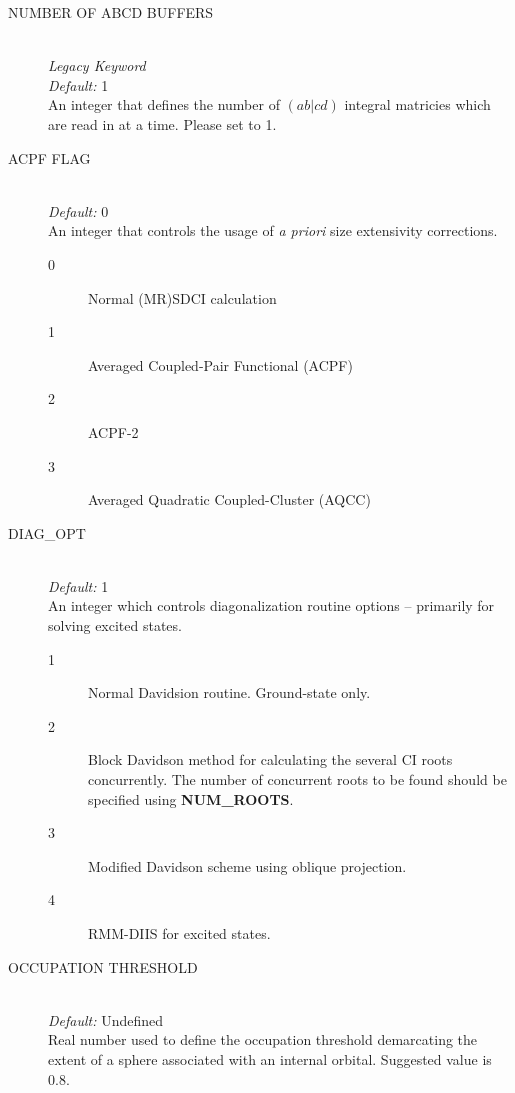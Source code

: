 \documentclass{article}
\begin{document}
\begin{description}
        \item[NUMBER OF ABCD BUFFERS ] \hfill \\
        \emph{Legacy Keyword} \hfill \\
        \emph{Default:} 1 \hfill \\
        An integer that defines the number of $(ab|cd)$ integral matricies which are read in at a time. Please set to 1. 
        
        \item[ACPF FLAG] \hfill \\
        \emph{Default:} 0 \hfill \\
        An integer that controls the usage of \emph{a priori} size extensivity corrections.
        \begin{description} 
        	\item[0] Normal (MR)SDCI calculation
        	\item[1] Averaged Coupled-Pair Functional (ACPF)
        	\item[2] ACPF-2
  		\item[3] Averaged Quadratic Coupled-Cluster (AQCC)       
        \end{description}
        
        
        \item[DIAG\_OPT] \hfill \\
        \emph{Default:} 1 \hfill \\
        An integer which controls diagonalization routine options -- primarily for solving excited states.
        \begin{description} 
        	\item[1] Normal Davidsion routine. Ground-state only. 
        	\item[2] Block Davidson method for calculating the several CI roots concurrently. The number of concurrent roots to be found should be specified using \textbf{NUM\_ROOTS}. 
  		\item[3] Modified Davidson scheme using oblique projection. 
  		\item[4] RMM-DIIS for excited states.       
        \end{description}
        
        \item[OCCUPATION THRESHOLD ] \hfill \\
        \emph{Default:} Undefined \hfill \\
        Real number used to define the occupation threshold demarcating the extent of a sphere associated with an internal orbital. Suggested value is 0.8.
        

\end{description}
\end{document}
